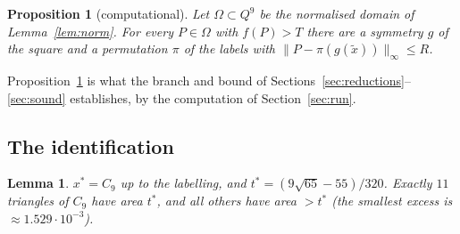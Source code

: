 \documentclass[11pt]{amsart}
\newtheorem{proposition}[theorem]{Proposition}
\newtheorem{lemma}[theorem]{Lemma}
\theoremstyle{definition}
\newcommand{\tstar}{t^{*}}
\begin{document}
\begin{proposition}[computational]\label{prop:bb}
Let $\Omega \subset Q^9$ be the normalised domain of Lemma~\ref{lem:norm}. For every $P \in \Omega$ with $f(P) > T$ there are a symmetry $g$ of the square and a permutation $\pi$ of the labels with $\|P - \pi(g(\tilde x))\|_\infty \le R$.
\end{proposition}
Proposition~\ref{prop:bb} is what the branch and bound of Sections~\ref{sec:reductions}--\ref{sec:sound} establishes, by the computation of Section~\ref{sec:run}.

\subsection{The identification}
\begin{lemma}\label{lem:ident}
$x^* = C_9$ up to the labelling, and $\tstar = (9\sqrt{65}-55)/320$. Exactly $11$ triangles of $C_9$ have area $\tstar$, and all others have area $> \tstar$ (the smallest excess is $\approx 1.529\cdot10^{-3}$).
\end{lemma}
\end{document}
